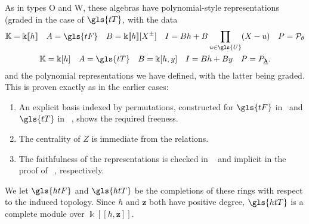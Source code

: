 \documentclass[10pt]{article}
\theoremstyle{definition}
\newcommand{\Bz}{\mathbf{z}}
\newcommand{\K}{\Bbbk}%
\newcommand{\la}{\lambda}
\newcommand{\cP}{\mathcal{P}}
\newcommand{\bla}{{\underline{\boldsymbol{\la}}}}
\newcommand\llbracket{[\![}
\newcommand\rrbracket{]\!]}
\begin{document}
As in types O and W, these algebras have polynomial-style
representations (graded in the case of $\gls{tT}$, with the data
\begin{gather*}%
\mathbb{K}=\K\llbracket h\rrbracket \quad A=\gls{tF}\quad
 B=\K\llbracket h\rrbracket [X^{\pm}]\quad I=Bh+B\prod_{u\in \gls{U}}(X-u)\quad P=\cP_{\theta}%
\\
\mathbb{K}=\K[h]\quad A=\gls{tT} \quad
 B=\K[h,y]\quad I=Bh+By \quad P=P_{\bla}.%
\end{gather*}
and the polynomial representations we have defined, with the latter
being graded. This is proven exactly as in the earlier cases:
\begin{enumerate}
\item An explicit basis indexed by permutations, constructed for
 $\gls{tF}$ in~\cite[Prop.~1.15]{MS18} and $\gls{tT} $ in
~\cite[Prop.~4.16]{Webmerged}, shows the required freeness.
 \item The
 centrality of $Z$ is immediate from the relations.
 \item The
 faithfulness of the representations is checked in
~\cite[Prop.~1.11]{MS18} and implicit in the proof of
~\cite[Prop.~4.16]{Webmerged}, respectively.
\end{enumerate}



 We let $\gls{htF}$ and 
 $\gls{htT}$ be the completions of these rings with respect to the
 induced topology. Since $h$ and $\Bz$ both have positive
 degree, $\gls{htT}$ is a complete module over $\K\llbracket h,\Bz\rrbracket $.
\end{document}
